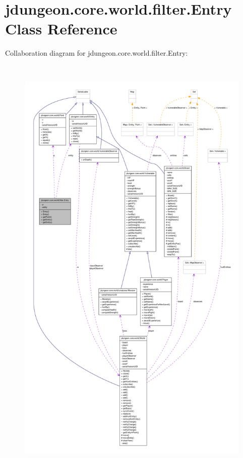 \hypertarget{classjdungeon_1_1core_1_1world_1_1filter_1_1_entry}{
\section{jdungeon.core.world.filter.Entry Class Reference}
\label{classjdungeon_1_1core_1_1world_1_1filter_1_1_entry}
}


Collaboration diagram for jdungeon.core.world.filter.Entry:
\nopagebreak
\begin{figure}[H]
\begin{center}
\leavevmode
\includegraphics[height=600pt]{classjdungeon_1_1core_1_1world_1_1filter_1_1_entry__coll__graph}
\end{center}
\end{figure}
